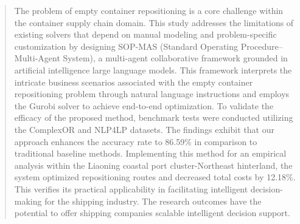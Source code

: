 \documentclass[preprint,12pt]{elsarticle}
\begin{document}
\begin{frontmatter}


\begin{abstract}
The problem of empty container repositioning is a core challenge within the container supply chain domain. This study addresses the limitations of existing solvers that depend on manual modeling and problem-specific customization by designing SOP-MAS (Standard Operating Procedure–Multi-Agent System), a multi-agent collaborative framework grounded in artificial intelligence large language models. This framework interprets the intricate business scenarios associated with the empty container repositioning problem through natural language instructions and employs the Gurobi solver to achieve end-to-end optimization. To validate the efficacy of the proposed method, benchmark tests were conducted utilizing the ComplexOR and NLP4LP datasets. The findings exhibit that our approach enhances the accuracy rate to 86.59\% in comparison to traditional baseline methods. Implementing this method for an empirical analysis within the Liaoning coastal port cluster-Northeast hinterland, the system optimized repositioning routes and decreased total costs by 12.18\%. This verifies its practical applicability in facilitating intelligent decision-making for the shipping industry. The research outcomes have the potential to offer shipping companies scalable intelligent decision support.
\end{abstract}




\end{frontmatter}
\end{document}
